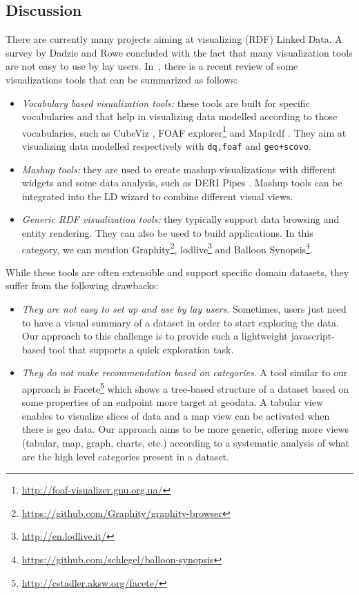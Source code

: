 \subsection{Discussion}
\label{sec:discussion}
There are currently many projects aiming at visualizing (RDF) Linked Data. A survey by Dadzie and Rowe \cite{Dadzie:2011} concluded with the fact that many visualization tools are not easy to use by lay users. In~\cite{Klimek2014}, there is a recent review of some visualizations tools that can be summarized as follows:
\begin{itemize}
 \item \textit{Vocabulary based visualization tools:} these tools are built for specific vocabularies and that help in visualizing data modelled according to those vocabularies, such as CubeViz \cite{cubeviz:2012}, FOAF explorer\footnote{\url{http://foaf-visualizer.gnu.org.ua/}} and Map4rdf \cite{leon2012}. They aim at visualizing data modelled respectively with \texttt{dq,foaf} and \texttt{geo+scovo}.
 \item \textit{Mashup tools:} they are used to create mashup visualizations with different widgets and some data analysis, such as DERI Pipes \cite{danh2009}. Mashup tools can be integrated into the LD wizard to combine different visual views.
 \item \textit{Generic RDF visualization tools:} they typically support data browsing and entity rendering. They can also be used to build applications. In this category, we can mention Graphity\footnote{\url{https://github.com/Graphity/graphity-browser}}, lodlive\footnote{\url{http://en.lodlive.it/}} and Balloon Synopsis\footnote{\url{https://github.com/schlegel/balloon-synopsis}}.
\end{itemize}
While these tools are often extensible and support specific domain datasets, they suffer from the following drawbacks:
\begin{itemize}
 \item \textit{They are not easy to set up and use by lay users}. Sometimes, users just need to have a visual summary of a dataset in order to start exploring the data. Our approach to this challenge is to provide such a lightweight javascript-based tool that supports a quick exploration task.
 \item \textit{They do not make recommendation based on categories}. A tool similar to our approach is Facete\footnote{\url{http://cstadler.aksw.org/facete/}}\cite{facete:2014} which shows a tree-based structure of a dataset based on some properties of an endpoint more target at geodata. A tabular view enables to visualize slices of data and a map view can be activated when there is geo data. Our approach aims to be more generic, offering more views (tabular, map, graph, charts, etc.) according to a systematic analysis of what are the high level categories present in a dataset.
\end{itemize}

